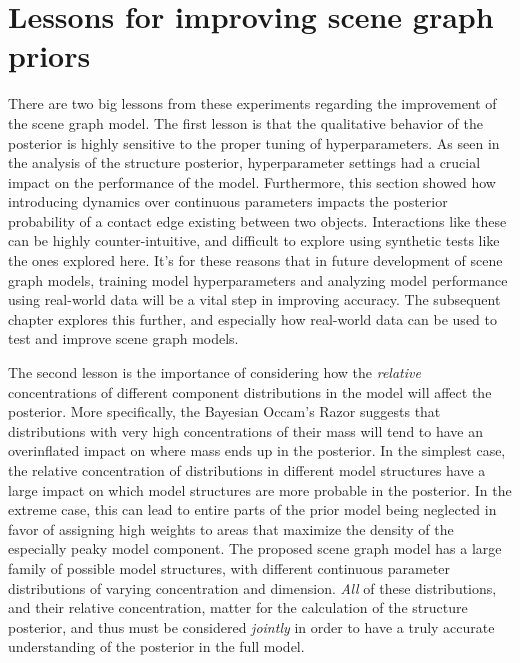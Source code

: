 \pagebreak

\section{Lessons for improving scene graph priors}
There are two big lessons from these experiments regarding the improvement of the scene graph model.
The first lesson is that the qualitative behavior of the posterior is highly sensitive to the proper tuning of hyperparameters.
As seen in the analysis of the structure posterior, hyperparameter settings had a crucial impact on the performance of the model.
Furthermore, this section showed how introducing dynamics over continuous parameters impacts the posterior probability of a contact edge existing between two objects.
Interactions like these can be highly counter-intuitive, and difficult to explore using synthetic tests like the ones explored here.
It's for these reasons that in future development of scene graph models, training model hyperparameters and analyzing model performance using real-world data will be a vital step in improving accuracy.
The subsequent chapter explores this further, and especially how real-world data can be used to test and improve scene graph models.

The second lesson is the importance of considering how the \textit{relative} concentrations of different component distributions in the model will affect the posterior.
More specifically, the Bayesian Occam's Razor suggests that distributions with very high concentrations of their mass will tend to have an overinflated impact on where mass ends up in the posterior.
In the simplest case, the relative concentration of distributions in different model structures have a large impact on which model structures are more probable in the posterior.
In the extreme case, this can lead to entire parts of the prior model being neglected in favor of assigning high weights to areas that maximize the density of the especially peaky model component.
The proposed scene graph model has a large family of possible model structures, with different continuous parameter distributions of varying concentration and dimension.
\textit{All} of these distributions, and their relative concentration, matter for the calculation of the structure posterior, and thus must be considered \textit{jointly} in order to have a truly accurate understanding of the posterior in the full model.
